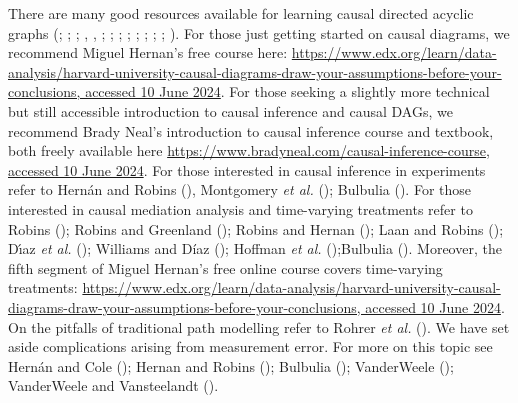 \documentclass[
  singlecolumn]{article}
\begin{document}
There are many good resources available for learning causal directed
acyclic graphs (;
;
;
,
, ;
;
;
;
;
;
;
; ). For those just getting started on causal diagrams,
we recommend Miguel Hernan's free course here:
\href{https://www.edx.org/learn/data-analysis/harvard-university-causal-diagrams-draw-your-assumptions-before-your-conclusions}{https://www.edx.org/learn/data-analysis/harvard-university-causal-diagrams-draw-your-assumptions-before-your-conclusions,
accessed 10 June 2024}. For those seeking a slightly more technical but
still accessible introduction to causal inference and causal DAGs, we
recommend Brady Neal's introduction to causal inference course and
textbook, both freely available here
\href{https://www.bradyneal.com/causal-inference-course}{https://www.bradyneal.com/causal-inference-course,
accessed 10 June 2024}. For those interested in causal inference in
experiments refer to Hernán and Robins
(), Montgomery \emph{et al.}
(); Bulbulia
(). For those interested
in causal mediation analysis and time-varying treatments refer to Robins
(); Robins and Greenland
(); Robins and Hernan
(); Laan and Robins
(); Dı́az
\emph{et al.} (); Williams and
Díaz (); Hoffman \emph{et al.}
();Bulbulia
(). Moreover, the fifth
segment of Miguel Hernan's free online course covers time-varying
treatments:
\href{https://www.edx.org/learn/data-analysis/harvard-university-causal-diagrams-draw-your-assumptions-before-your-conclusions}{https://www.edx.org/learn/data-analysis/harvard-university-causal-diagrams-draw-your-assumptions-before-your-conclusions,
accessed 10 June 2024}. On the pitfalls of traditional path modelling
refer to Rohrer \emph{et al.} (). We
have set aside complications arising from measurement error. For more on
this topic see Hernán and Cole
(); Hernan and Robins
(); Bulbulia
(); VanderWeele
(); VanderWeele and Vansteelandt
().
\end{document}
